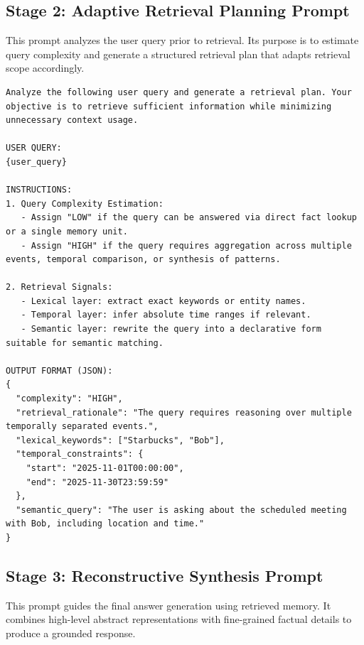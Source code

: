 \subsection{Stage 2: Adaptive Retrieval Planning Prompt}
\label{app:prompt_stage2}

This prompt analyzes the user query prior to retrieval. Its purpose is to estimate query complexity and generate a structured retrieval plan that adapts retrieval scope accordingly.

\begin{lstlisting}[caption={Prompt for Query Analysis and Adaptive Retrieval Planning.}, label={lst:query_analysis}]
Analyze the following user query and generate a retrieval plan. Your objective is to retrieve sufficient information while minimizing unnecessary context usage.

USER QUERY:
{user_query}

INSTRUCTIONS:
1. Query Complexity Estimation:
   - Assign "LOW" if the query can be answered via direct fact lookup or a single memory unit.
   - Assign "HIGH" if the query requires aggregation across multiple events, temporal comparison, or synthesis of patterns.

2. Retrieval Signals:
   - Lexical layer: extract exact keywords or entity names.
   - Temporal layer: infer absolute time ranges if relevant.
   - Semantic layer: rewrite the query into a declarative form suitable for semantic matching.

OUTPUT FORMAT (JSON):
{
  "complexity": "HIGH",
  "retrieval_rationale": "The query requires reasoning over multiple temporally separated events.",
  "lexical_keywords": ["Starbucks", "Bob"],
  "temporal_constraints": {
    "start": "2025-11-01T00:00:00",
    "end": "2025-11-30T23:59:59"
  },
  "semantic_query": "The user is asking about the scheduled meeting with Bob, including location and time."
}
\end{lstlisting}

\subsection{Stage 3: Reconstructive Synthesis Prompt}
\label{app:prompt_stage3}

This prompt guides the final answer generation using retrieved memory. It combines high-level abstract representations with fine-grained factual details to produce a grounded response.


